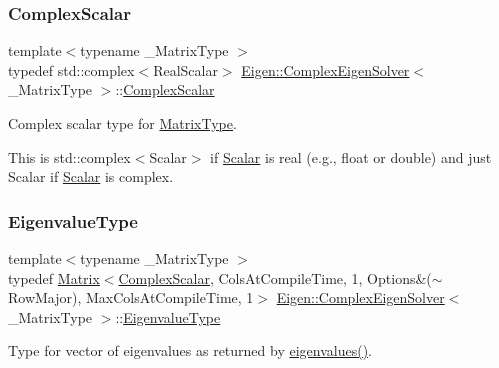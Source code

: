 \subsubsection{\texorpdfstring{ComplexScalar}{ComplexScalar}}
{\footnotesize\ttfamily template$<$typename \+\_\+\+Matrix\+Type $>$ \\
typedef std\+::complex$<$Real\+Scalar$>$ \mbox{\hyperlink{class_eigen_1_1_complex_eigen_solver}{Eigen\+::\+Complex\+Eigen\+Solver}}$<$ \+\_\+\+Matrix\+Type $>$\+::\mbox{\hyperlink{class_eigen_1_1_complex_eigen_solver_a3604c99a69fac3bee42c88cb2b589143}{Complex\+Scalar}}}



Complex scalar type for \mbox{\hyperlink{class_eigen_1_1_complex_eigen_solver_ad61f6278843a601096276c9a72c0252f}{Matrix\+Type}}. 

This is {\ttfamily std\+::complex$<$\+Scalar$>$} if \mbox{\hyperlink{class_eigen_1_1_complex_eigen_solver_a61035d40c9498bb1d47628cdd4946785}{Scalar}} is real (e.\+g., {\ttfamily float} or {\ttfamily double}) and just {\ttfamily Scalar} if \mbox{\hyperlink{class_eigen_1_1_complex_eigen_solver_a61035d40c9498bb1d47628cdd4946785}{Scalar}} is complex. \mbox{\label{class_eigen_1_1_complex_eigen_solver_ad3a663b1ff5200a098dabbbf9b7162b1}} 
\subsubsection{\texorpdfstring{EigenvalueType}{EigenvalueType}}
{\footnotesize\ttfamily template$<$typename \+\_\+\+Matrix\+Type $>$ \\
typedef \mbox{\hyperlink{class_eigen_1_1_matrix}{Matrix}}$<$\mbox{\hyperlink{class_eigen_1_1_complex_eigen_solver_a3604c99a69fac3bee42c88cb2b589143}{Complex\+Scalar}}, Cols\+At\+Compile\+Time, 1, Options\&($\sim$Row\+Major), Max\+Cols\+At\+Compile\+Time, 1$>$ \mbox{\hyperlink{class_eigen_1_1_complex_eigen_solver}{Eigen\+::\+Complex\+Eigen\+Solver}}$<$ \+\_\+\+Matrix\+Type $>$\+::\mbox{\hyperlink{class_eigen_1_1_complex_eigen_solver_ad3a663b1ff5200a098dabbbf9b7162b1}{Eigenvalue\+Type}}}



Type for vector of eigenvalues as returned by \mbox{\hyperlink{class_eigen_1_1_complex_eigen_solver_a10c25c7620e7faedcd39991cce3a757b}{eigenvalues()}}. 


